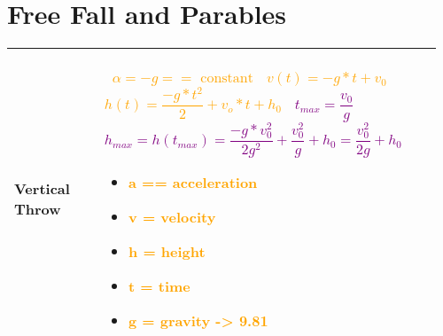 \documentclass[main.tex,fontsize=8pt,paper=a4,paper=portrait,DIV=calc,]{scrartcl}
\begin{document}
\begin{table}[ht!]
\section{Free Fall and Parables}
\begin{tabular}{|m{0.2\linewidth}|m{0.755\linewidth}|}
\hline
Vertical Throw & 
\, \newline
\huge \textcolor{orange}{\( \alpha = -g == \text{ constant}  \)}\newline
\, \newline
\huge \textcolor{orange}{\( v(t) = -g * t + v_0 \)}\newline
\, \newline
\huge \textcolor{orange}{\( h(t) = \dfrac{-g * t^2}{2} + v_o * t + h_0  \)}\newline
\, \newline
\huge \textcolor{purple}{\( t_{max} = \dfrac{v_0}{g} \)}\newline
\, \newline
\huge \textcolor{purple}{\( h_{max} = h(t_{max}) = \dfrac{-g * v^{2}_{0}}{2 g^2 } + \dfrac{v_{0}^{2}}{g} + h_0 = \dfrac{v_{0}^{2}}{2g} + h_0 \)}\newline
\, \newline \normalsize
\begin{itemize}
\item \textcolor{orange}{a == acceleration}
\item \textcolor{orange}{v = velocity}
\item \textcolor{orange}{h = height}
\item \textcolor{orange}{t = time}
\item \textcolor{orange}{g = gravity -> 9.81}
\end{itemize} 
\\
\hline
\end{tabular}
\end{table}
\pagebreak
\end{document}

